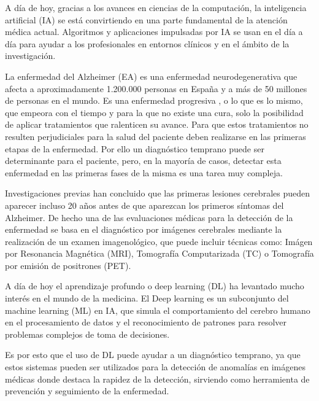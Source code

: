 

A día de hoy, gracias a los avances en ciencias de la computación, la inteligencia artificial (IA) se está convirtiendo
en una parte fundamental de la atención médica actual.
Algoritmos y aplicaciones impulsadas por IA se usan en el día a día para ayudar a los profesionales en entornos clínicos
y en el ámbito de la investigación.

La enfermedad del Alzheimer (EA)  es una enfermedad neurodegenerativa que afecta a aproximadamente 1.200.000 personas
en España y a más de 50 millones de personas en el mundo.
 Es una enfermedad progresiva , o lo que es lo mismo, que empeora con el tiempo y para la que no existe una cura, solo
la posibilidad de aplicar tratamientos que ralenticen su avance.
Para que estos tratamientos no resulten perjudiciales para la salud del paciente deben realizarse en las primeras etapas
de la enfermedad.
Por ello un diagnóstico temprano puede ser determinante para el paciente, pero, en la mayoría de casos, detectar esta
enfermedad en las primeras fases de la misma es una tarea muy compleja.

Investigaciones previas han concluido que las primeras lesiones cerebrales pueden aparecer incluso 20 años antes de que
aparezcan los primeros síntomas del Alzheimer.
De hecho una de las evaluaciones médicas para la detección de la enfermedad se basa en el diagnóstico por imágenes
cerebrales mediante la realización de un examen imagenológico, que puede incluir técnicas como: Imágen por Resonancia
Magnética (MRI), Tomografía Computarizada (TC) o Tomografía por emisión de positrones (PET).

A día de hoy el aprendizaje profundo o deep learning (DL)  ha levantado mucho interés en el mundo de la medicina.
El Deep learning es un subconjunto del machine learning (ML) en IA, que simula el comportamiento del cerebro humano en
el procesamiento de datos y el reconocimiento de patrones para resolver problemas complejos de toma de decisiones.

Es por esto que el uso de DL puede ayudar a un diagnóstico temprano, ya que estos sistemas pueden ser utilizados para la
detección de anomalías en imágenes médicas donde destaca la rapidez de la detección, sirviendo como herramienta de
prevención y seguimiento de la enfermedad.

